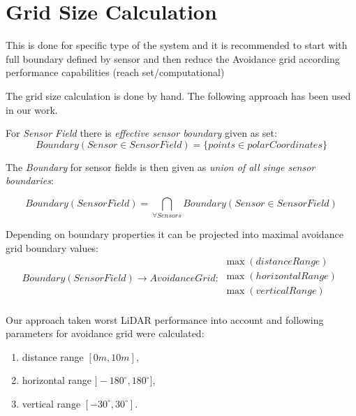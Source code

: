 \chapter{Grid Size Calculation}\label{app:gridSizeCalculation}


\begin{note}
	This is done for specific type of the system and it is recommended to start with full boundary defined by sensor and then reduce the Avoidance grid according performance capabilities (reach set/computational)
\end{note}

\noindent The grid size calculation is done by hand. The following approach has been used in our work. 

For \emph{Sensor Field} there is \emph{effective sensor boundary} given as set:
\begin{equation}
    Boundary(Sensor \in Sensor Field) = \{points \in polarCoordinates\}
\end{equation}

\noindent The \emph{Boundary} for sensor fields is then given as \emph{union of all singe sensor boundaries}:

\begin{equation}
     Boundary(Sensor Field) = \bigcap_{\forall Sensors} Boundary(Sensor \in Sensor Field)
\end{equation}

\noindent Depending on boundary properties it can be projected into maximal avoidance grid boundary values:
\begin{equation}
    Boundary(Sensor Field) \to Avoidance Grid : 
    \begin{gathered}
        \max(distanceRange)\\
        \max(horizontalRange)\\
        \max(verticalRange)\\
    \end{gathered}
\end{equation}

\noindent Our approach taken worst LiDAR performance into account \cite{sabatini2014lidar} and following parameters for avoidance grid were calculated:

\begin{enumerate}
    \item distance range $[0m,10m]$,
    \item horizontal range $]-180^\circ,180^\circ]$,
    \item vertical range $[-30^\circ,30^\circ]$.
\end{enumerate}

